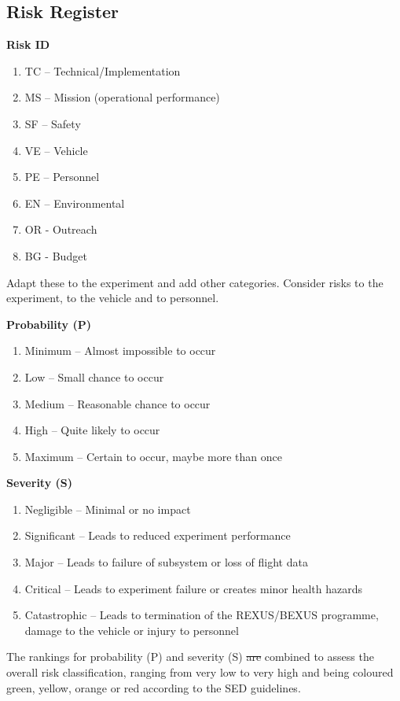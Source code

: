 \documentclass[a4paper,12pt,oneside]{article}
\providecommand{\DIFaddtex}[1]{{\protect\color{blue}\uwave{#1}}} %
\providecommand{\DIFdeltex}[1]{{\protect\color{red}\sout{#1}}}                      %
\providecommand{\DIFaddbegin}{} %
\providecommand{\DIFaddend}{} %
\providecommand{\DIFdelbegin}{} %
\providecommand{\DIFdelend}{} %
\providecommand{\DIFadd}[1]{\texorpdfstring{\DIFaddtex{#1}}{#1}} %
\providecommand{\DIFdel}[1]{\texorpdfstring{\DIFdeltex{#1}}{}} %
\newcommand{\DIFscaledelfig}{0.5}
\newlength{\DIFdelgraphicswidth} %
\newlength{\DIFdelgraphicsheight} %
\newcommand{\DIFaddincludegraphics}[2][]{{\color{blue}\fbox{\DIFOincludegraphics[#1]{#2}}}} %
\newcommand{\DIFdelincludegraphics}[2][]{%
\sbox{\DIFdelgraphicsbox}{\DIFOincludegraphics[#1]{#2}}%
\settoboxwidth{\DIFdelgraphicswidth}{\DIFdelgraphicsbox} %
\settoboxtotalheight{\DIFdelgraphicsheight}{\DIFdelgraphicsbox} %
\scalebox{\DIFscaledelfig}{%
\parbox[b]{\DIFdelgraphicswidth}{\usebox{\DIFdelgraphicsbox}\\[-\baselineskip] \rule{\DIFdelgraphicswidth}{0em}}\llap{\resizebox{\DIFdelgraphicswidth}{\DIFdelgraphicsheight}{%
\setlength{\unitlength}{\DIFdelgraphicswidth}%
\begin{picture}(1,1)%
\thicklines\linethickness{2pt} %
{\color[rgb]{1,0,0}\put(0,0){\framebox(1,1){}}}%
{\color[rgb]{1,0,0}\put(0,0){\line( 1,1){1}}}%
{\color[rgb]{1,0,0}\put(0,1){\line(1,-1){1}}}%
\end{picture}%
}\hspace*{3pt}}} %
} %
\DeclareRobustCommand{\DIFaddbegin}{\DIFOaddbegin \let\includegraphics\DIFaddincludegraphics} %
\DeclareRobustCommand{\DIFaddend}{\DIFOaddend \let\includegraphics\DIFOincludegraphics} %
\DeclareRobustCommand{\DIFdelbegin}{\DIFOdelbegin \let\includegraphics\DIFdelincludegraphics} %
\DeclareRobustCommand{\DIFdelend}{\DIFOaddend \let\includegraphics\DIFOincludegraphics} %
\begin{document}
\subsection{Risk Register}
\textbf{Risk ID}
\begin{enumerate}[label={}]
    \item TC – Technical/Implementation 
    \item MS – Mission (operational performance) 
    \item SF – Safety 
    \item VE – Vehicle 
    \item PE – Personnel 
    \item EN – Environmental 
    \item OR - Outreach
    \item BG - Budget
\end{enumerate}

Adapt these to the experiment and add other categories. 
Consider risks to the experiment, to the vehicle and to personnel. 

\textbf{Probability (P)}
\begin{enumerate}[label=\Alph*]
    \item Minimum – Almost impossible to occur 
    \item Low – Small chance to occur 
    \item Medium – Reasonable chance to occur 
    \item High – Quite likely to occur 
    \item Maximum – Certain to occur, maybe more than once
\end{enumerate}

\textbf{Severity (S)}
\begin{enumerate}
    \item Negligible – Minimal or no impact 
    \item Significant – Leads to reduced experiment performance 
    \item Major – Leads to failure of subsystem or loss of flight data 
    \item Critical – Leads to experiment failure or creates minor health hazards 
    \item Catastrophic – Leads to termination of the REXUS/BEXUS programme, damage to the vehicle or injury to personnel 
\end{enumerate}

The rankings for probability (P) and severity (S) \DIFdelbegin \DIFdel{are }\DIFdelend \DIFaddbegin \DIFadd{were }\DIFaddend combined to assess the overall risk classification, ranging from very low to very high and being coloured green, yellow, orange or red according to the SED guidelines.
\end{document}
